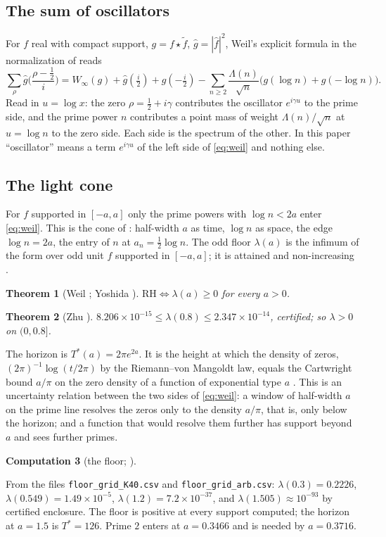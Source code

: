 \documentclass[11pt]{article}
\newtheorem{theorem}{Theorem}[section]
\theoremstyle{definition}
\newtheorem{computation}[theorem]{Computation}
\theoremstyle{remark}
\newcommand{\Tst}{T^{*}}
\begin{document}
\subsection{The sum of oscillators}
For $f$ real with compact support, $g=f\star\tilde f$, $\hat g=|\hat f|^2$, Weil's explicit formula in the normalization of \cite{window} reads
\begin{equation}\label{eq:weil}
\sum_\rho\hat g\Big(\frac{\rho-\frac12}{i}\Big)=W_\infty(g)+\hat g(\tfrac i2)+\hat g(-\tfrac i2)-\sum_{n\ge2}\frac{\Lambda(n)}{\sqrt n}\big(g(\log n)+g(-\log n)\big).
\end{equation}
Read in $u=\log x$: the zero $\rho=\tfrac12+i\gamma$ contributes the oscillator $e^{i\gamma u}$ to the prime side, and the prime power $n$ contributes a point mass of weight $\Lambda(n)/\sqrt n$ at $u=\log n$ to the zero side. Each side is the spectrum of the other. In this paper ``oscillator'' means a term $e^{i\gamma u}$ of the left side of \eqref{eq:weil} and nothing else.

\subsection{The light cone}
For $f$ supported in $[-a,a]$ only the prime powers with $\log n<2a$ enter \eqref{eq:weil}. This is the cone of \cite[\S12]{folds}: half-width $a$ as time, $\log n$ as space, the edge $\log n=2a$, the entry of $n$ at $a_n=\tfrac12\log n$. The odd floor $\lambda(a)$ is the infimum of the form over odd unit $f$ supported in $[-a,a]$; it is attained and non-increasing \cite[Lemma 1.4]{window}.
\begin{theorem}[Weil \cite{weil52}; Yoshida \cite{yoshida}]\label{thm:weil}
$\mathrm{RH}\iff\lambda(a)\ge0$ for every $a>0$.
\end{theorem}
\begin{theorem}[Zhu {\cite[Thm.\ 6.2]{zhu}}]\label{thm:zhu}
$8.206\times10^{-15}\le\lambda(0.8)\le2.347\times10^{-14}$, certified; so $\lambda>0$ on $(0,0.8]$.
\end{theorem}
The horizon is $\Tst(a)=2\pi e^{2a}$. It is the height at which the density of zeros, $(2\pi)^{-1}\log(t/2\pi)$ by the Riemann--von Mangoldt law, equals the Cartwright bound $a/\pi$ on the zero density of a function of exponential type $a$ \cite[\S1]{window}. This is an uncertainty relation between the two sides of \eqref{eq:weil}: a window of half-width $a$ on the prime line resolves the zeros only to the density $a/\pi$, that is, only below the horizon; and a function that would resolve them further has support beyond $a$ and sees further primes.
\begin{computation}[the floor; {\cite{folds,window}}]\label{comp:floor}
\begin{sloppypar}\noindent From the files \texttt{floor\_grid\_K40.csv} and \texttt{floor\_grid\_arb.csv}: $\lambda(0.3)=0.2226$, $\lambda(0.549)=1.49\times10^{-5}$, $\lambda(1.2)=7.2\times10^{-37}$, and $\lambda(1.505)\approx10^{-93}$ by certified enclosure. The floor is positive at every support computed; the horizon at $a=1.5$ is $\Tst=126$. Prime $2$ enters at $a=0.3466$ and is needed by $a=0.3716$.\end{sloppypar}
\end{computation}
\end{document}
